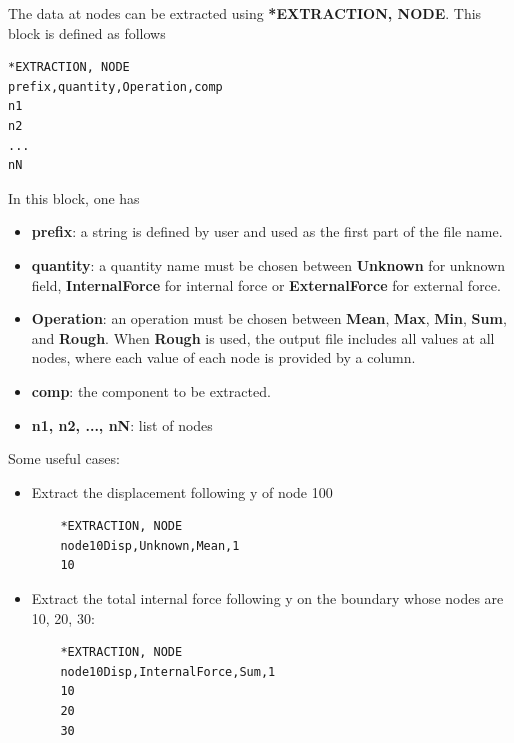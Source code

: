 \documentclass[oneside,11pt,times]{book}
\begin{document}
The data at nodes can be extracted using \textbf{*EXTRACTION, NODE}. This block is defined as follows
\begin{lstlisting}
*EXTRACTION, NODE
prefix,quantity,Operation,comp
n1
n2
...
nN
\end{lstlisting}
In this block, one has
\begin{itemize}
	\item \textbf{prefix}: a string is defined by user and used as the first part of the file name.
	\item \textbf{quantity}: a quantity name must be chosen between \textbf{Unknown} for unknown field, \textbf{InternalForce} for internal force or \textbf{ExternalForce} for external force.
	\item \textbf{Operation}: an operation must be chosen between \textbf{Mean}, \textbf{Max}, \textbf{Min}, \textbf{Sum}, and \textbf{Rough}. When \textbf{Rough} is used, the output file includes all values at all nodes, where each value of each node is provided by a column.
	\item \textbf{comp}: the component to be extracted.
	\item \textbf{n1, n2, ..., nN}: list of nodes
\end{itemize}
Some useful cases:
\begin{itemize}
	\item Extract the displacement following y of node 100
	\begin{lstlisting}
	*EXTRACTION, NODE
	node10Disp,Unknown,Mean,1
	10
	\end{lstlisting}
	\item Extract the total internal force following y on the boundary whose nodes are 10, 20, 30:
	\begin{lstlisting}
	*EXTRACTION, NODE
	node10Disp,InternalForce,Sum,1
	10
	20
	30
	\end{lstlisting}
\end{itemize}
\end{document}
